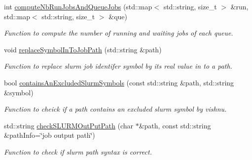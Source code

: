\begin{DoxyCompactItemize}
int \hyperlink{classSlurmServer_a2b7eabbb5025b76e1828001d946a267e}{computeNbRunJobsAndQueueJobs} (std::map$<$ std::string, size\_\-t $>$ \&run, std::map$<$ std::string, size\_\-t $>$ \&que)
\begin{DoxyCompactList}\small\item\em Function to compute the number of running and waiting jobs of each queue. \item\end{DoxyCompactList}\item 
void \hyperlink{classSlurmServer_a27e52d883798ce8ba9d341da69364245}{replaceSymbolInToJobPath} (std::string \&path)
\begin{DoxyCompactList}\small\item\em Function to replace slurm job identifer symbol by its real value in to a path. \item\end{DoxyCompactList}\item 
bool \hyperlink{classSlurmServer_a81c65cc4a6b83c291b5ec2c8ca028169}{containsAnExcludedSlurmSymbols} (const std::string \&path, std::string \&symbol)
\begin{DoxyCompactList}\small\item\em Function to cheick if a path contains an excluded slurm symbol by vishnu. \item\end{DoxyCompactList}\item 
std::string \hyperlink{classSlurmServer_a6c33cb8cae0ca873cd8b59fe5df85634}{checkSLURMOutPutPath} (char $\ast$\&path, const std::string \&pathInfo=\char`\"{}job output path\char`\"{})
\begin{DoxyCompactList}\small\item\em Function to check if slurm path syntax is correct. \item\end{DoxyCompactList}\end{DoxyCompactItemize}
